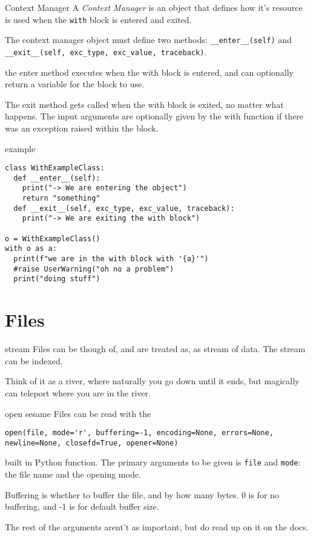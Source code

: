 \begin{frame}[containsverbatim]{Context Manager}
  A \textit{Context Manager} is an object that defines how it's resource is used when the \verb|with| block is entered and exited.

  The context manager object must define two methods: \verb|__enter__(self)| and \verb|__exit__(self, exc_type, exc_value, traceback)|.

  the enter method executes when the with block is entered, and can optionally return a variable for the block to use.

  The exit method gets called when the with block is exited, no matter what happens. The input arguments are optionally given by the with function if there was an exception raised within the block.
\end{frame}

\begin{frame}[containsverbatim]{example}
\begin{verbatim}
class WithExampleClass:
  def __enter__(self):
    print("-> We are entering the object")
    return "something"
  def __exit__(self, exc_type, exc_value, traceback):
    print("-> We are exiting the with block")

o = WithExampleClass()
with o as a:
  print(f"we are in the with block with '{a}'")
  #raise UserWarning("oh no a problem")
  print("doing stuff")
\end{verbatim}
\end{frame}

\section{Files}

\begin{frame}[containsverbatim]{stream}
  Files can be though of, and are treated as, as stream of data.
  The stream can be indexed.

  Think of it as a river, where naturally you go down until it ends, but magically can teleport where you are in the river.
\end{frame}

\begin{frame}[containsverbatim]{open sesame}
  Files can be read with the
  \begin{verbatim}
open(file, mode='r', buffering=-1, encoding=None, errors=None, newline=None, closefd=True, opener=None)
\end{verbatim}
  built in Python function. The primary arguments to be given is \verb|file| and \verb|mode|: the file name and the opening mode.

  Buffering is whether to buffer the file, and by how many bytes. 0 is for no buffering, and -1 is for default buffer size.

  The rest of the arguments arent't as important, but do read up on it on the docs.
\end{frame}

